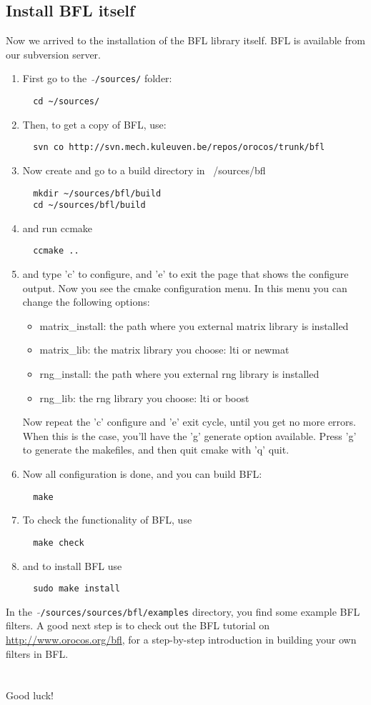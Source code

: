 \documentclass[a4paper,10pt]{article}
\begin{document}
\subsection{Install BFL itself}
Now we arrived to the installation of the BFL library itself. BFL is
available from our subversion server.
\begin{enumerate}
\item First go to the \ $\mathtt{\tilde{ }}$\texttt{/sources/} folder:
\begin{verbatim}
  cd ~/sources/
\end{verbatim}
\item Then, to get a copy of BFL, use:
\begin{verbatim}
  svn co http://svn.mech.kuleuven.be/repos/orocos/trunk/bfl
\end{verbatim}
\item Now create and go to a build directory in ~/sources/bfl
\begin{verbatim}
  mkdir ~/sources/bfl/build
  cd ~/sources/bfl/build
\end{verbatim}
\item and run ccmake
\begin{verbatim}
  ccmake ..
\end{verbatim}
\item and type 'c' to configure, and 'e' to exit the page that shows
  the configure output. Now you see the cmake configuration menu. In
  this menu you can change the following options:
\begin{itemize}
\item matrix\_install: the path where you external matrix library is
  installed
\item matrix\_lib: the matrix library you choose: lti or newmat
\item rng\_install: the path where you external rng library is
  installed
\item rng\_lib: the rng library you choose: lti or boost
\end{itemize}
Now repeat the 'c' configure and 'e' exit cycle, until you get no more
errors. When this is the case, you'll have the 'g' generate option
available. Press 'g' to generate the makefiles, and then quit cmake
with 'q' quit.
\item Now all configuration is done, and you can build BFL:
\begin{verbatim}
  make 
\end{verbatim}	
\item To check the functionality of BFL, use
\begin{verbatim}
  make check
\end{verbatim}	
\item and to install BFL use
\begin{verbatim}
  sudo make install
\end{verbatim}
\end{enumerate}
In the \ $\mathtt{\tilde{ }}$\texttt{/sources/sources/bfl/examples} directory, you find some example BFL
filters. A good next step is to check out the BFL tutorial on
\url{http://www.orocos.org/bfl}, for a step-by-step introduction in building
your own filters in BFL.
\\\\\\
Good luck!
\end{document}
